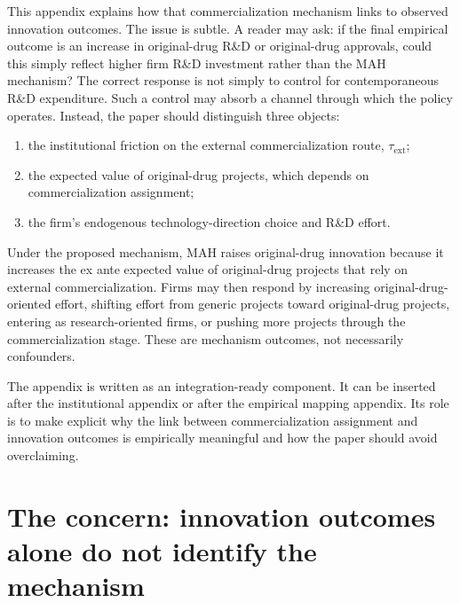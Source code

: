 \documentclass[12pt]{article}
\newcommand{\tauext}{\tau_{\mathrm{ext}}}
\begin{document}
This appendix explains how that commercialization mechanism links to observed innovation outcomes. The issue is subtle. A reader may ask: if the final empirical outcome is an increase in original-drug R\&D or original-drug approvals, could this simply reflect higher firm R\&D investment rather than the MAH mechanism? The correct response is not simply to control for contemporaneous R\&D expenditure. Such a control may absorb a channel through which the policy operates. Instead, the paper should distinguish three objects:
\begin{enumerate}
    \item the institutional friction on the external commercialization route, $\tauext$;
    \item the expected value of original-drug projects, which depends on commercialization assignment;
    \item the firm's endogenous technology-direction choice and R\&D effort.
\end{enumerate}
Under the proposed mechanism, MAH raises original-drug innovation because it increases the ex ante expected value of original-drug projects that rely on external commercialization. Firms may then respond by increasing original-drug-oriented effort, shifting effort from generic projects toward original-drug projects, entering as research-oriented firms, or pushing more projects through the commercialization stage. These are mechanism outcomes, not necessarily confounders.

The appendix is written as an integration-ready component. It can be inserted after the institutional appendix or after the empirical mapping appendix. Its role is to make explicit why the link between commercialization assignment and innovation outcomes is empirically meaningful and how the paper should avoid overclaiming.

\section{The concern: innovation outcomes alone do not identify the mechanism}
\end{document}
